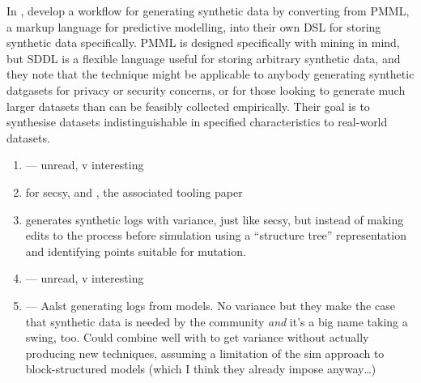 




In \cite{eno2008generating},
\citeauthor{eno2008generating} develop a workflow for generating synthetic data
by converting from PMML, a markup language for predictive modelling, into their
own DSL for storing synthetic data specifically. PMML is designed specifically
with mining in mind, but SDDL is a flexible language useful for storing
arbitrary synthetic data, and they note that the technique might be applicable
to anybody generating synthetic datgasets for privacy or security concerns, or
for those looking to generate much larger datasets than can be feasibly
collected empirically. Their goal is to synthesise datasets
indistinguishable in specified characteristics to real-world datasets.

\begin{enumerate}
    \item \cite{Yousfi_2015} --- unread, v interesting
    \item \cite{stocker2013secsy} for secsy, and \cite{stocker2014secsy}, the associated
    tooling paper
    \item \cite{pourmasoumi2015business} generates synthetic logs with variance,
    just like secsy, but instead of making edits to the process before
    simulation using a ``structure tree'' representation and identifying points
    suitable for mutation.
    \item \cite{Loreti_2019} --- unread, v interesting
    \item \cite{ExecutableBPMNMitsyuk} --- Aalst generating logs from models. No
    variance but they make the case that synthetic data is needed by the
    community \emph{and} it's a big name taking a swing, too. Could combine well
    with \cite{pourmasoumi2015business} to get variance without actually
    producing new techniques, assuming a limitation of the sim approach to
    block-structured models (which I think they already impose anyway…)
\end{enumerate}



